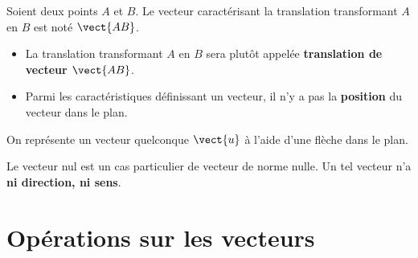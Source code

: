 \documentclass{article}
\begin{document}
\begin{definition}
Soient deux points $A$ et $B$. Le vecteur caractérisant la translation transformant $A$ en $B$ est noté $\vect{AB}$.
\end{definition}
\begin{remark}
\hfill
\begin{itemize}
\item La translation transformant $A$ en $B$ sera plutôt appelée \textbf{translation de vecteur $\vect{AB}$}.
\item Parmi les caractéristiques définissant un vecteur, il n'y a pas la \textbf{position} du vecteur dans le plan.
\end{itemize}
\end{remark}
\begin{example}
On représente un vecteur quelconque $\vect{u}$ à l'aide d'une flèche dans le plan.
\begin{center}
\end{center}
\end{example}
\begin{tcolorbox}
Le vecteur nul est un cas particulier de vecteur de norme nulle. Un tel vecteur n'a \textbf{ni direction, ni sens}.
\end{tcolorbox}
\newpage
\section{Opérations sur les vecteurs}
\end{document}
